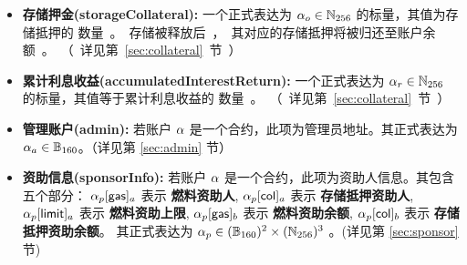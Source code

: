 \begin{itemize}[nosep]
	\item {\bf 存储押金(storageCollateral):} 一个正式表达为 $\mathbf{\alpha}_o\in \mathbb{N}_{256}$ 的标量，其值为存储抵押的 \unit 数量。存储被释放后，其对应的存储抵押将被归还至账户余额。（详见第 \ref{sec:collateral} 节）

	\item {\bf 累计利息收益(accumulatedInterestReturn):} 一个正式表达为 $\mathbf{\alpha}_r\in \mathbb{N}_{256}$ 的标量，其值等于累计利息收益的 \unit 数量。（详见第 \ref{sec:collateral} 节）

	\item {\bf 管理账户(admin):} 若账户 $\mathbf{\alpha}$ 是一个合约，此项为管理员地址。其正式表达为 $\mathbf{\alpha}_a\in \mathbb{B}_{160}$。（详见第 \ref{sec:admin} 节）

	\item {\bf 资助信息(sponsorInfo):} 若账户 $\mathbf{\alpha}$ 是一个合约，此项为资助人信息。其包含五个部分： $\mathbf{\alpha}_p[{\sf gas}]_a$ 表示 {\bf 燃料资助人}, $\mathbf{\alpha}_p[{\sf col}]_a$ 表示 {\bf 存储抵押资助人}, $\mathbf{\alpha}_p[{\sf limit}]_a$ 表示 {\bf 燃料资助上限}, $\mathbf{\alpha}_p[{\sf gas}]_b$ 表示 {\bf 燃料资助余额}, $\mathbf{\alpha}_p[{\sf col}]_b$ 表示 {\bf 存储抵押资助余额}。
	其正式表达为 $\mathbf{\alpha}_p\in (\mathbb{B}_{160})^2\times (\mathbb{N}_{256})^3$ 。(详见第 \ref{sec:sponsor} 节)
\end{itemize}

